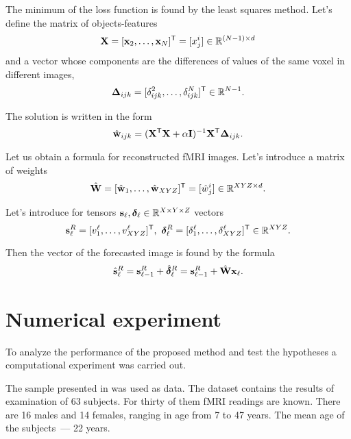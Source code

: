 \documentclass{article}
\begin{document}
The minimum of the loss function is found by the least squares method. Let's define the matrix of objects-features
\begin{equation}
	\label{eq10}
	\mathbf{X} = [\mathbf{x}_2, \ldots, \mathbf{x}_N]^{\mathsf{T}} = [x^i_j] \in \mathbb{R}^{(N-1) \times d}
\end{equation}
and a vector whose components are the differences of values of the same voxel in different images,
\begin{equation}
	\label{eq11}
	\mathbf{\Delta}_{ijk} = [\delta^2_{ijk}, \ldots, \delta^N_{ijk}]^{\mathsf{T}} \in \mathbb{R}^{N-1}.
\end{equation}

The solution is written in the form
\begin{equation}
	\label{eq12}
	\hat{\mathbf{w}}_{ijk} = (\mathbf{X}^{\mathsf{T}} \mathbf{X} + \alpha \mathbf{I})^{-1} \mathbf{X}^{\mathsf{T}} \mathbf{\Delta}_{ijk}.
\end{equation}

Let us obtain a formula for reconstructed fMRI images. Let's introduce a matrix of weights
\begin{equation}
	\label{eq13}
	\hat{\mathbf{W}} = [\hat{\mathbf{w}}_1, \ldots, \hat{\mathbf{w}}_{XYZ}]^{\mathsf{T}} = [\hat{w}^i_j] \in \mathbb{R}^{XYZ \times d}.
\end{equation}

Let's introduce for tensors $\mathbf{s}_{\ell}, \boldsymbol{\delta}_{\ell} \in \mathbb{R}^{X \times Y \times Z}$ vectors
\[ \mathbf{s}_{\ell}^{R} = [ v^{\ell}_1, \ldots, v^{\ell}_{XYZ} ]^{\mathsf{T}},\
	\boldsymbol{\delta}_{\ell}^{R} = [ \delta^{\ell}_1, \ldots, \delta^{\ell}_{XYZ} ]^{\mathsf{T}} \in \mathbb{R}^{XYZ}. \]

Then the vector of the forecasted image is found by the formula
\begin{equation}
	\label{eq14}
	\hat{\mathbf{s}}_{\ell}^{R} = \mathbf{s}_{\ell-1}^{R} + \hat{\boldsymbol{\delta}}_{\ell}^{R} = \mathbf{s}_{\ell-1}^{R} + \hat{\mathbf{W}} \mathbf{x}_{\ell}.
\end{equation}

\section{Numerical experiment}

To analyze the performance of the proposed method and test the hypotheses
a computational experiment was carried out.

The sample presented in \citep{Berezutskaya2022} was used as data.
The dataset contains the results of examination of 63 subjects.
For thirty of them fMRI readings are known.
There are 16 males and 14 females, ranging in age from 7 to 47 years.
The mean age of the subjects~--- 22 years.
\end{document}
